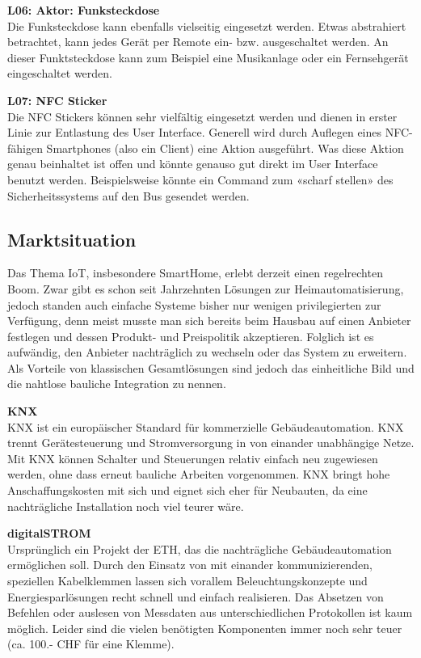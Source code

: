 \textbf{L06: Aktor: Funksteckdose} \\
Die Funksteckdose kann ebenfalls vielseitig eingesetzt werden. Etwas abstrahiert betrachtet, kann jedes Gerät per Remote ein- bzw. ausgeschaltet werden. An dieser Funktsteckdose kann zum Beispiel eine Musikanlage oder ein Fernsehgerät eingeschaltet werden.

\textbf{L07: NFC Sticker} \\
Die NFC Stickers können sehr vielfältig eingesetzt werden und dienen in erster Linie zur Entlastung des User Interface. Generell wird durch Auflegen eines NFC-fähigen Smartphones (also ein Client) eine Aktion ausgeführt. Was diese Aktion genau beinhaltet ist offen und könnte genauso gut direkt im User Interface benutzt werden. Beispielsweise könnte ein Command zum «scharf stellen» des Sicherheitssystems auf den Bus gesendet werden.

\subsection{Marktsituation}
Das Thema IoT, insbesondere SmartHome, erlebt derzeit einen regelrechten Boom. Zwar gibt es schon seit Jahrzehnten Lösungen zur Heimautomatisierung, jedoch standen auch einfache Systeme bisher nur wenigen privilegierten zur Verfügung, denn meist musste man sich bereits beim Hausbau auf einen Anbieter  festlegen und dessen Produkt- und Preispolitik akzeptieren. Folglich ist es aufwändig, den Anbieter nachträglich zu wechseln oder das System zu erweitern. Als Vorteile von klassischen Gesamtlösungen sind jedoch das einheitliche Bild und die nahtlose bauliche Integration zu nennen.

\textbf{KNX} \\
KNX ist ein europäischer Standard für kommerzielle Gebäudeautomation. KNX trennt Gerätesteuerung und Stromversorgung in von einander unabhängige Netze. Mit KNX können Schalter und Steuerungen relativ einfach neu zugewiesen werden, ohne dass erneut bauliche Arbeiten vorgenommen. KNX bringt hohe Anschaffungskosten mit sich und eignet sich eher für Neubauten, da eine nachträgliche Installation noch viel teurer wäre.

\textbf{digitalSTROM} \\
Ursprünglich ein Projekt der ETH, das die nachträgliche Gebäudeautomation ermöglichen soll. Durch den Einsatz von mit einander kommunizierenden, speziellen Kabelklemmen lassen sich vorallem Beleuchtungskonzepte und Energiesparlösungen recht schnell und einfach realisieren. Das Absetzen von Befehlen oder auslesen von Messdaten aus unterschiedlichen Protokollen ist kaum möglich. Leider sind die vielen benötigten Komponenten immer noch sehr teuer (ca. 100.- CHF für eine Klemme). 

